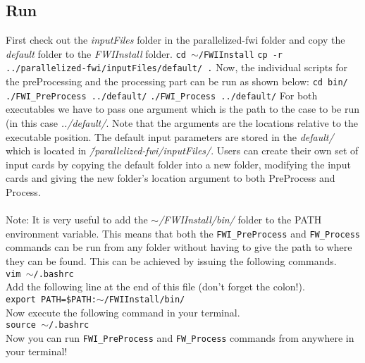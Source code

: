 \documentclass[10pt]{article}
\begin{document}
\subsection{Run}
First check out the \textit{inputFiles} folder in the parallelized-fwi folder and copy the \textit{default} folder to the \textit{FWIInstall} folder. 
\newline
\texttt{cd $\sim$/FWIInstall}
\newline
\texttt{cp -r ../parallelized-fwi/inputFiles/default/ .} 
\newline
Now, the individual scripts for the preProcessing and the processing part can be run as shown below:
\newline
\texttt{cd bin/}
\newline
\texttt{./FWI\_PreProcess ../default/}
\newline
\texttt{./FWI\_Process ../default/}
\newline
\noindent For both executables we have to pass one argument which is the path to the case to be run (in this case \textit{../default/}. Note that the arguments are the locations relative to the executable position. The default input parameters are stored in the \textit{default/} which is located in \textit{\~/parallelized-fwi/inputFiles/}. Users can create their own set of input cards by copying the default folder into a new folder, modifying the input cards and giving the new folder's location argument to both PreProcess and Process.\\
\\
Note: It is very useful to add the \textit{$\sim$/FWIInstall/bin/} folder to the PATH environment variable. This means that both the \texttt{FWI\_PreProcess} and \texttt{FW\_Process} commands can be run from any folder without having to give the path to where they can be found. This can be achieved by issuing the following commands. \\
\texttt{vim $\sim$/.bashrc}\\
Add the following line at the end of this file (don't forget the colon!).\\
\texttt{export PATH=\$PATH:$\sim$/FWIInstall/bin/}\\
Now execute the following command in your terminal.\\
\texttt{source $\sim$/.bashrc}\\
Now you can run \texttt{FWI\_PreProcess} and \texttt{FW\_Process} commands from anywhere in your terminal!
\end{document}
